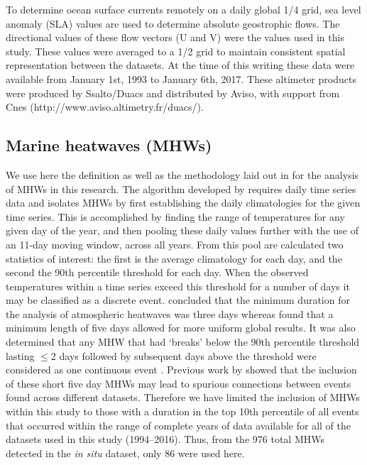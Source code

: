 \documentclass[utf8]{frontiersSCNS}
\begin{document}
To determine ocean surface currents remotely on a daily global 1/4\degree \: grid, sea level anomaly (SLA) values are used to determine absolute geostrophic flows. The directional values of these flow vectors (U and V) were the values used in this study. These values were averaged to a 1/2\degree \: grid to maintain consistent spatial representation between the datasets. At the time of this writing these data were available from January 1st, 1993 to January 6th, 2017. These altimeter products were produced by Ssalto/Duacs and distributed by Aviso, with support from Cnes (http://www.aviso.altimetry.fr/duacs/). 

\subsection{Marine heatwaves (MHWs)}
We use here the definition as well as the methodology laid out in \citet{Hobday2016} for the analysis of MHWs in this research. The algorithm developed by \citet{Hobday2016} requires daily time series data and isolates MHWs by first establishing the daily climatologies for the given time series. This is accomplished by finding the range of temperatures for any given day of the year, and then pooling these daily values further with the use of an 11-day moving window, across all years. From this pool are calculated two statistics of interest: the first is the average climatology for each day, and the second the 90th percentile threshold for each day. When the observed temperatures within a time series exceed this threshold for a number of days it may be classified as a discrete event. \citet{Perkins2013} concluded that the minimum duration for the analysis of atmospheric heatwaves was three days whereas \citet{Hobday2016} found that a minimum length of five days allowed for more uniform global results. It was also determined that any MHW that had `breaks' below the 90th percentile threshold lasting $\leq$2 days followed by subsequent days above the threshold were considered as one continuous event \citep{Hobday2016}. Previous work by \citet{Schlegel2017} showed that the inclusion of these short five day MHWs may lead to spurious connections between events found across different datasets. Therefore we have limited the inclusion of MHWs within this study to those with a duration in the top 10th percentile of all events that occurred within the range of complete years of data available for all of the datasets used in this study (1994--2016). Thus, from the 976 total MHWs detected in the \emph{in situ} dataset, only 86 were used here.
\end{document}
